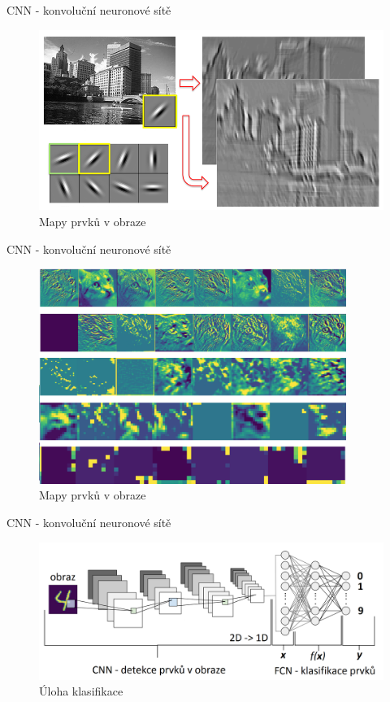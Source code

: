 \documentclass[aspectratio=1610]{beamer}
\begin{document}
\begin{frame}{CNN - konvoluční neuronové sítě}
	\begin{figure}[h]
	\begin{center}
		\includegraphics[width=12cm, keepaspectratio]{maps2.png}
	\end{center}
	\caption{Mapy prvků v obraze} 	
\end{figure}
\end{frame}
\begin{frame}{CNN - konvoluční neuronové sítě}
\begin{figure}[h]
	\begin{center}
		\includegraphics[width=10cm, keepaspectratio]{maps.png}
	\end{center}
	\caption{Mapy prvků v obraze} 	
\end{figure}
\end{frame}
\begin{frame}{CNN - konvoluční neuronové sítě}
\begin{figure}[h]
	\begin{center}
		\includegraphics[width=15cm, keepaspectratio]{cnn.png}
	\end{center}
	\caption{Úloha klasifikace} 	
\end{figure}
\end{frame}
\end{document}

